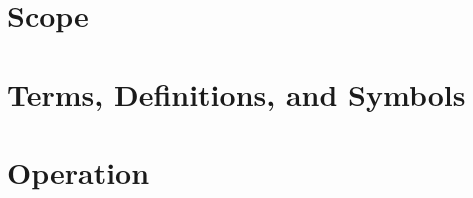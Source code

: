 \documentclass[12pt,letterpaper]{report}
\begin{document}
\chapter{Scope}

\chapter{Terms, Definitions, and Symbols}

\chapter{Operation}

\end{document}
